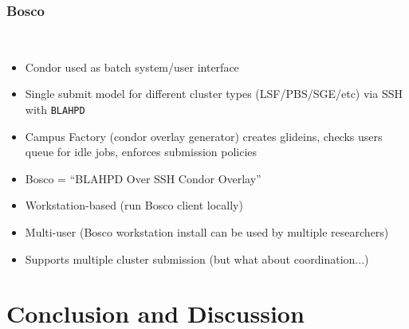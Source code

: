 \documentclass{sig-alternate}
\begin{document}
\subsubsection{Bosco}
\\
\begin{itemize}
\item Condor used as batch system/user interface
\item Single submit model for different cluster types (LSF/PBS/SGE/etc) via SSH with \texttt{BLAHPD}
\item Campus Factory (condor overlay generator) creates glideins, checks users queue for idle jobs, 
  enforces submission policies
\item Bosco = ``BLAHPD Over SSH Condor Overlay''
\item Workstation-based (run Bosco client locally)
\item Multi-user (Bosco workstation install can be used by multiple researchers)
\item Supports multiple cluster submission (but what about coordination...)

\end{itemize}
% 




\section{Conclusion and Discussion}
\end{document}
